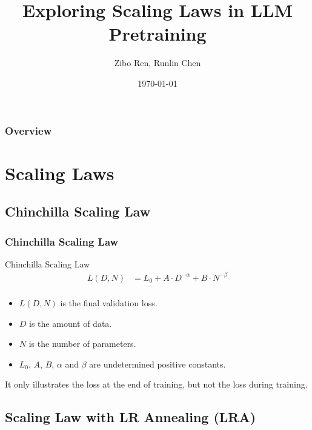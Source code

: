 \documentclass[aspectratio=169]{beamer}
\title[Scaling Laws]{
    Exploring Scaling Laws in LLM Pretraining
}
\author{Zibo Ren, Runlin Chen}
\institute[PKU]
{
    Peking University \\
    \medskip
    \texttt{\{2200010626,2200010848\}@stu.pku.edu.cn}
}
\date{\today}
\begin{document}
\begin{frame}
    \titlepage
\end{frame}

\begin{frame}
    \frametitle{Overview}
    \tableofcontents
\end{frame}

\section{Scaling Laws}\label{sec:scalinglaws}

\subsection{Chinchilla Scaling Law}\label{subsec:chinchilla}
\begin{frame}
    \frametitle{Chinchilla Scaling Law}
    \begin{block}{Chinchilla Scaling Law}
        \begin{equation}
            \label{eq:chinchilla}
            \begin{aligned}
                L(D, N) &= L_0 + A\cdot D^{-\alpha} + B\cdot N^{-\beta} \\
            \end{aligned}
        \end{equation}
    \end{block}
    \begin{itemize}
        \item $L(D, N)$ is the final validation loss.
        \item $D$ is the amount of data.
        \item $N$ is the number of parameters.
        \item $L_0$, $A$, $B$, $\alpha$ and $\beta$ are undetermined
            positive constants.
    \end{itemize}

    It only illustrates the loss at the end of training, but not the
    loss during training.
\end{frame}

\subsection{Scaling Law with LR Annealing (LRA)}\label{subsec:LRA}
\end{document}
